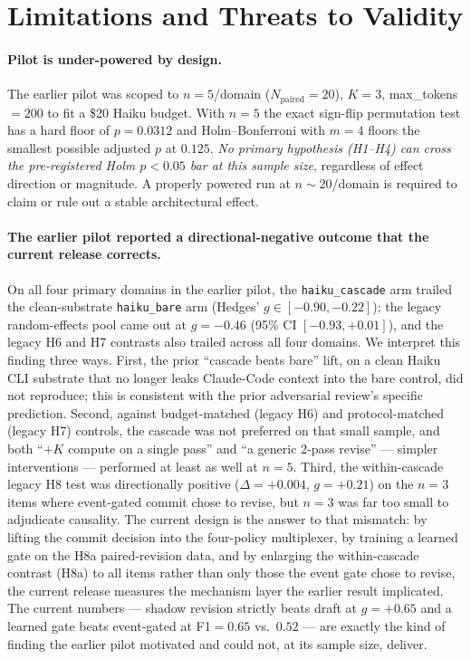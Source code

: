 \section{Limitations and Threats to Validity}\label{sec:limitations}

\sloppy

\paragraph{Pilot is under-powered by design.} The earlier pilot was scoped to $n{=}5$/domain ($N_{\text{paired}}{=}20$), $K{=}3$, max\_tokens$=200$ to fit a \$20 Haiku budget. With $n{=}5$ the exact sign-flip permutation test has a hard floor of $p{=}0.0312$ and Holm--Bonferroni with $m{=}4$ floors the smallest possible adjusted $p$ at $0.125$. \emph{No primary hypothesis (H1--H4) can cross the pre-registered Holm $p<0.05$ bar at this sample size}, regardless of effect direction or magnitude. A properly powered run at $n{\sim}20$/domain is required to claim or rule out a stable architectural effect.

\paragraph{The earlier pilot reported a directional-negative outcome that the current release corrects.} On all four primary domains in the earlier pilot, the \texttt{haiku\_cascade} arm trailed the clean-substrate \texttt{haiku\_bare} arm (Hedges' $g \in [-0.90, -0.22]$); the legacy random-effects pool came out at $g=-0.46$ (95\% CI $[-0.93, +0.01]$), and the legacy H6 and H7 contrasts also trailed across all four domains. We interpret this finding three ways. First, the prior ``cascade beats bare'' lift, on a clean Haiku CLI substrate that no longer leaks Claude-Code context into the bare control, did not reproduce; this is consistent with the prior adversarial review's specific prediction. Second, against budget-matched (legacy H6) and protocol-matched (legacy H7) controls, the cascade was not preferred on that small sample, and both ``$+K$ compute on a single pass'' and ``a generic 2-pass revise'' --- simpler interventions --- performed at least as well at $n=5$. Third, the within-cascade legacy H8 test was directionally positive ($\Delta=+0.004$, $g=+0.21$) on the $n=3$ items where event-gated commit chose to revise, but $n=3$ was far too small to adjudicate causality. The current design is the answer to that mismatch: by lifting the commit decision into the four-policy multiplexer, by training a learned gate on the H8a paired-revision data, and by enlarging the within-cascade contrast (H8a) to all items rather than only those the event gate chose to revise, the current release measures the mechanism layer the earlier result implicated. The current numbers --- shadow revision strictly beats draft at $g=+0.65$ and a learned gate beats event-gated at F1${}=0.65$ vs.\ $0.52$ --- are exactly the kind of finding the earlier pilot motivated and could not, at its sample size, deliver.


